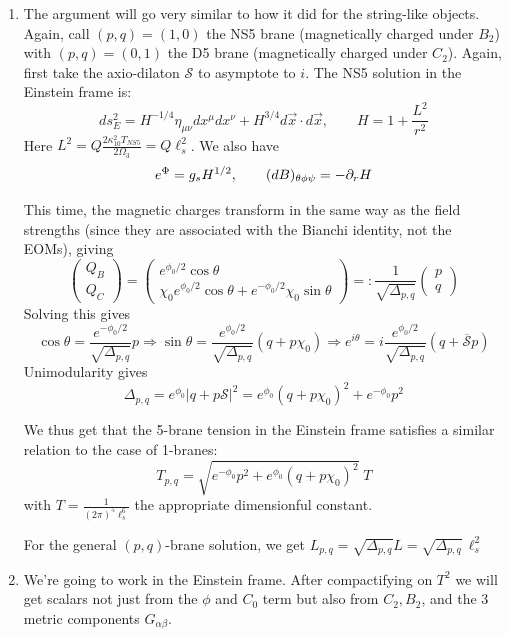 \documentclass[11pt, class=article, crop=false]{standalone}
\begin{document}
\begin{enumerate}
	\item The argument will go very similar to how it did for the string-like objects. Again, call $(p,q) = (1,0)$ the NS5 brane (magnetically charged under $B_2$) with $(p,q) = (0,1)$ the D5 brane (magnetically charged under $C_2$). Again, first take the axio-dilaton $\mathcal S$ to asymptote to $i$. The NS5 solution in the Einstein frame is:
	\[
		ds_E^2 = H^{-1/4} \eta_{\mu \nu} dx^\mu  dx^\nu + H^{3/4} d\vec x \cdot d\vec x, \qquad H = 1 + \frac{L^2}{r^2}
	\]
	Here $L^2 = Q \frac{2 \kappa^2_{10} T_{NS5}}{2 \Omega_3} = Q \ell_s^2$. We also have
	\[
		e^{\Phi} = g_s H^{1/2}, \qquad (dB)_{\theta \phi \psi} = -\partial_r H
	\]
	
	This time, the magnetic charges transform in the same way as the field strengths (since they are associated with the Bianchi identity, not the EOMs), giving 
	\[
		\begin{pmatrix}
			Q_B\\
			Q_C
		\end{pmatrix}
		=  \begin{pmatrix}
			e^{\phi_0/2} \cos \theta\\
			\chi_0 e^{\phi_0/2} \cos \theta + e^{-\phi_0/2} \chi_0 \sin \theta
		\end{pmatrix}  =: \frac{1}{\sqrt{\Delta_{p,q}}} \begin{pmatrix}
			p\\q
		\end{pmatrix}
	\]
	Solving this gives
	\[
		\cos \theta = \frac{e^{- \phi_0/2}}{\sqrt{\Delta_{p,q}}} p \Rightarrow \sin \theta = \frac{e^{\phi_0/2}}{\sqrt{\Delta_{p,q}}} (q + p \chi_0) \Rightarrow e^{i\theta} = i \frac{e^{\phi_0/2}}{\sqrt{\Delta_{p,q}}} (q + \overline {\mathcal S} p)
	\]
	Unimodularity gives 
	\[
		\Delta_{p,q} = e^{\phi_0} |q+p \mathcal S|^2 = e^{\phi_0} (q + p \chi_0)^2 + e^{-\phi_0} p^2
	\]
	
	We thus get that the 5-brane tension in the Einstein frame satisfies a similar relation to the case of 1-branes:
	\[
		T_{p,q} = \sqrt{e^{-\phi_0} p^2 + e^{\phi_0} (q + p \chi_0)^2}\; T
	\]
	with $T = \frac{1}{(2\pi)^5 \ell_s^6}$ the appropriate dimensionful constant. 
	
	For the general $(p,q)$-brane solution, we get $L_{p,q} = \sqrt{\Delta_{p,q}} L = \sqrt{\Delta_{p,q}}\, \ell_s^2$
	
	\item We're going to work in the Einstein frame. After compactifying on $T^2$ we will get scalars not just from the $\phi$ and $C_0$ term but also from $C_2, B_2$, and the 3 metric components $G_{\alpha \beta}$. 
	

\end{enumerate}
\end{document}
